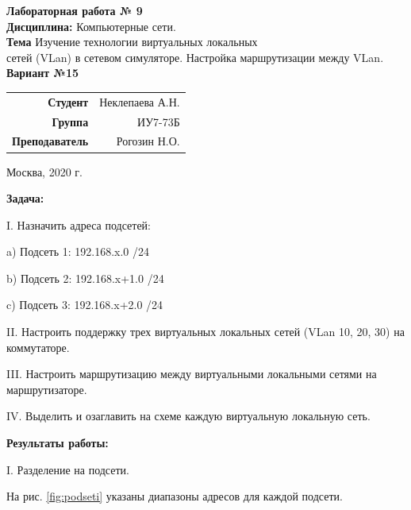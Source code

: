 \documentclass[a4paper,14pt]{extreport} %
\begin{document}
\begin{titlepage}
	\vspace{2cm}
	
	\begin{center}
		\textbf{Лабораторная работа № 9} \\
		\textbf{Дисциплина:}  Компьютерные сети.  \\
		\textbf{Тема} 
		Изучение технологии виртуальных локальных \\ сетей (VLan) в сетевом симуляторе. Настройка маршрутизации между VLan.\\
		\textbf{Вариант №15} \\
	\end{center}

    \vspace{4cm}
    
	\begin{flushright}
		\begin{tabular}{rr}
			\textbf{Студент} & Неклепаева А.Н. \\
			\textbf{Группа} & ИУ7-73Б \\
			\textbf{Преподаватель} & Рогозин Н.О.   \\
		\end{tabular}
	\end{flushright}
	
	\vspace{7cm}
	
	\begin{center}
		Москва, 2020 г.
	\end{center}
	
\end{titlepage}

\textbf{Задача:} 

I. Назначить адреса подсетей:

a) Подсеть 1: 192.168.x.0 /24

b) Подсеть 2: 192.168.x+1.0 /24

c) Подсеть 3: 192.168.x+2.0 /24

II. Настроить поддержку трех виртуальных локальных сетей (VLan 10, 20, 30) на коммутаторе.

III. Настроить маршрутизацию между виртуальными локальными сетями на маршрутизаторе.

IV. Выделить и озаглавить на схеме каждую виртуальную локальную сеть.

\textbf{Результаты работы:}

I. Разделение на подсети.

На рис. \ref{fig:podseti} указаны диапазоны адресов для каждой подсети.
\end{document}
